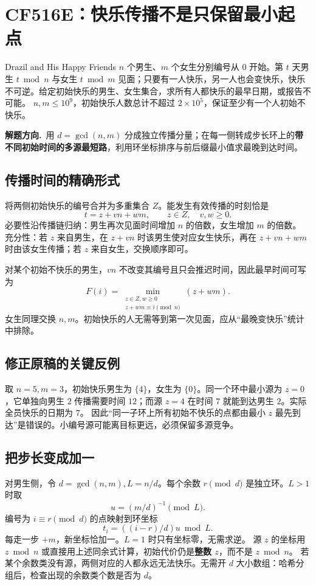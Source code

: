 \documentclass[UTF8,a4paper,11pt,twoside,openright,fontset=fandol]{ctexbook}
\theoremstyle{definition}
\newcommand{\hint}{\par\noindent\textbf{解题方向.}\ }
\begin{document}
\section{CF516E：快乐传播不是只保留最小起点}
\begin{problem}{Drazil and His Happy Friends}
$n$ 个男生、$m$ 个女生分别编号从 $0$ 开始。第 $t$ 天男生 $t\bmod n$ 与女生 $t\bmod m$ 见面；只要有一人快乐，另一人也会变快乐，快乐不可逆。给定初始快乐的男生、女生集合，求所有人都快乐的最早日期，或报告不可能。
$n,m\le10^9$，初始快乐人数总计不超过 $2\times10^5$，保证至少有一个人初始不快乐。
\end{problem}
\hint 用 $d=\gcd(n,m)$ 分成独立传播分量；在每一侧转成步长环上的\textbf{带不同初始时间的多源最短路}，利用环坐标排序与前后缀最小值求最晚到达时间。

\subsection{传播时间的精确形式}
将两侧初始快乐的编号合并为多重集合 $Z$。能发生有效传播的时刻恰是
\[
 t=z+vn+wm,\qquad z\in Z,\quad v,w\ge0.
\]
必要性沿传播链归纳：男生再次见面时间增加 $n$ 的倍数，女生增加 $m$ 的倍数。
充分性：若 $z$ 来自男生，在 $z+vn$ 时该男生使对应女生快乐，再在 $z+vn+wm$ 时由该女生传播；若 $z$ 来自女生，交换顺序即可。

对某个初始不快乐的男生，$vn$ 不改变其编号且只会推迟时间，因此最早时间可写为
\[
 F(i)=\min_{\substack{z\in Z,w\ge0\\z+wm\equiv i\pmod n}}(z+wm).
\]
女生同理交换 $n,m$。初始快乐的人无需等到第一次见面，应从“最晚变快乐”统计中排除。

\subsection{修正原稿的关键反例}
取 $n=5,m=3$，初始快乐男生为 $\{4\}$，女生为 $\{0\}$。同一个环中最小源为 $z=0$，它单独向男生 $2$ 传播需要时间 $12$；而源 $z=4$ 在时间 $7$ 就能到达男生 $2$。实际全员快乐的日期为 $7$。
因此“同一子环上所有初始不快乐的点都由最小 $z$ 最先到达”是错误的。小编号源可能离目标更远，必须保留多源竞争。

\subsection{把步长变成加一}
对男生侧，令 $d=\gcd(n,m),L=n/d$。每个余数 $r\pmod d$ 是独立环。$L>1$ 时取
\[
 u=(m/d)^{-1}\pmod L.
\]
编号为 $i\equiv r\pmod d$ 的点映射到环坐标
\[
 t_i=((i-r)/d)u\bmod L.
\]
每走一步 $+m$，新坐标恰加一。$L=1$ 时只有坐标零，无需求逆。
源 $z$ 的坐标用 $z\bmod n$ 或直接用上述同余式计算，初始代价仍是\textbf{整数 $z$}，而不是 $z\bmod n$。
若某个余数类没有源，两侧对应的人都永远无法快乐。无需开 $d$ 大小数组：哈希分组后，检查出现的余数类个数是否为 $d$。
\end{document}
